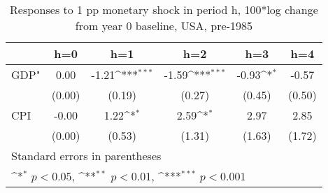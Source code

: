 \begin{table}[htbp]\centering
\def\sym#1{\ifmmode^{#1}\else\(^{#1}\)\fi}
\caption{Responses to 1 pp monetary shock in period h, 100*log change from year 0 baseline, USA, pre-1985}
\begin{tabular}{l*{5}{c}}
\hline\hline
            &\multicolumn{1}{c}{h=0}&\multicolumn{1}{c}{h=1}&\multicolumn{1}{c}{h=2}&\multicolumn{1}{c}{h=3}&\multicolumn{1}{c}{h=4}\\
\hline
GDP"        &        0.00         &       -1.21\sym{***}&       -1.59\sym{***}&       -0.93\sym{*}  &       -0.57         \\
            &      (0.00)         &      (0.19)         &      (0.27)         &      (0.45)         &      (0.50)         \\
[1em]
CPI         &       -0.00         &        1.22\sym{*}  &        2.59\sym{*}  &        2.97         &        2.85         \\
            &      (0.00)         &      (0.53)         &      (1.31)         &      (1.63)         &      (1.72)         \\
\hline\hline
\multicolumn{6}{l}{\footnotesize Standard errors in parentheses}\\
\multicolumn{6}{l}{\footnotesize \sym{*} \(p<0.05\), \sym{**} \(p<0.01\), \sym{***} \(p<0.001\)}\\
\end{tabular}
\end{table}
